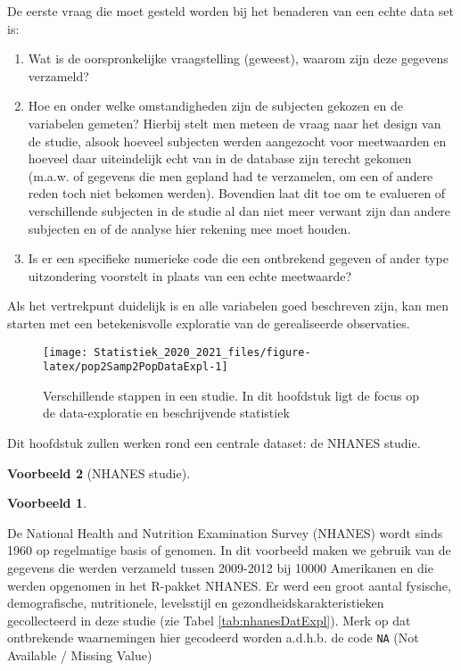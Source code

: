 \documentclass[
  12pt,dutch,coursenotes]{book}
\providecommand{\tightlist}{%
  \setlength{\itemsep}{0pt}\setlength{\parskip}{0pt}}
\theoremstyle{definition}
\theoremstyle{definition}
\newtheorem{example}{Voorbeeld}[chapter]
\theoremstyle{definition}
\theoremstyle{remark}
\begin{document}
De eerste vraag die moet gesteld worden bij het benaderen van een echte data
set is:

\begin{enumerate}
\def\labelenumi{\arabic{enumi}.}
\tightlist
\item
  Wat is de oorspronkelijke vraagstelling (geweest), waarom zijn deze
  gegevens verzameld?
\item
  Hoe en onder welke omstandigheden zijn de subjecten gekozen en de variabelen gemeten? Hierbij stelt men meteen de vraag naar het design van de studie, alsook hoeveel subjecten werden aangezocht voor meetwaarden en hoeveel daar uiteindelijk echt van in de database zijn terecht gekomen (m.a.w. of gegevens die men gepland had te verzamelen, om een of andere reden toch niet bekomen werden). Bovendien laat dit toe om te evalueren of verschillende subjecten in de studie al dan niet meer verwant zijn dan andere subjecten en of de analyse hier rekening mee moet houden.
\item
  Is er een specifieke numerieke code die een ontbrekend gegeven of
  ander type uitzondering voorstelt in plaats van een echte meetwaarde?
\end{enumerate}

Als het vertrekpunt duidelijk is en alle variabelen goed beschreven zijn,
kan men starten met een betekenisvolle exploratie van de gerealiseerde
observaties.

\begin{figure}

{\centering \texttt{[image: Statistiek\_2020\_2021\_files/figure-latex/pop2Samp2PopDataExpl-1]} 

}

\caption{Verschillende stappen in een studie. In dit hoofdstuk ligt de focus op de data-exploratie en beschrijvende statistiek}\label{fig:pop2Samp2PopDataExpl}
\end{figure}

Dit hoofdstuk zullen werken rond een centrale dataset: de NHANES studie.

\begin{example}[NHANES studie]
\begin{example}

\protect\hypertarget{exm:nhanesEx}{}{\label{exm:nhanesEx} \iffalse (NHANES studie) \fi{} }

\end{example}
\end{example}

De National Health and Nutrition Examination Survey
(NHANES) wordt sinds 1960 op regelmatige basis of genomen. In dit voorbeeld maken we gebruik van de gegevens die werden verzameld tussen 2009-2012 bij 10000 Amerikanen en die werden opgenomen in het R-pakket NHANES. Er werd een groot aantal fysische, demografische, nutritionele, levelsstijl en gezondheidskarakteristieken gecollecteerd in deze studie (zie Tabel \ref{tab:nhanesDatExpl}). Merk op dat ontbrekende waarnemingen hier gecodeerd worden a.d.h.b. de code \texttt{NA} (Not Available / Missing Value)
\end{document}
